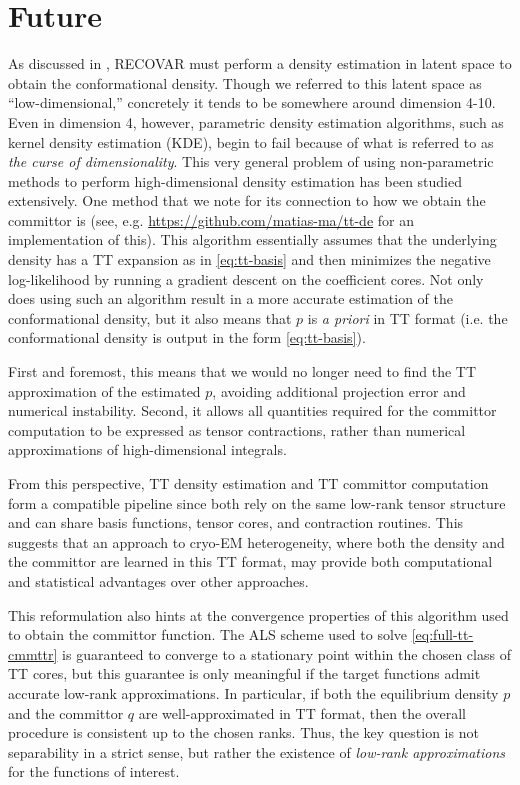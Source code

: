 \documentclass[11pt]{amsart}
\begin{document}
\section{Future}\label{sec:fut}
As discussed in , RECOVAR must perform a density estimation in latent space to obtain the conformational density. Though we referred to this latent space as ``low-dimensional,'' concretely it tends to be somewhere around dimension 4-10. Even in dimension 4, however, parametric density estimation algorithms, such as kernel density estimation (KDE), begin to fail because of what is referred to as \emph{the curse of dimensionality}. This very general problem of using non-parametric methods to perform high-dimensional density estimation has been studied extensively. One method that we note for its connection to how we obtain the committor is \cite{ttde} (see, e.g. \url{https://github.com/matias-ma/tt-de} for an implementation of this). This algorithm essentially assumes that the underlying density has a TT expansion as in \cref{eq:tt-basis} and then minimizes the negative log-likelihood by running a gradient descent on the coefficient cores. Not only does using such an algorithm result in a more accurate estimation of the conformational density, but it also means that $p$ is \emph{a priori} in TT format (i.e. the conformational density is output in the form \cref{eq:tt-basis}). 

First and foremost, this means that we would no longer need to find the TT approximation of the estimated $p$, avoiding additional projection error and numerical instability. Second, it allows all quantities required for the committor computation to be expressed as tensor contractions, rather than numerical approximations of high-dimensional integrals.

From this perspective, TT density estimation and TT committor computation form a compatible pipeline since both rely on the same low-rank tensor structure and can share basis functions, tensor cores, and contraction routines. This suggests that an approach to cryo-EM heterogeneity, where both the density and the committor are learned in this TT format, may provide both computational and statistical advantages over other approaches.

This reformulation also hints at the convergence properties of this algorithm used to obtain the committor function. The ALS scheme used to solve \cref{eq:full-tt-cmmttr} is guaranteed to converge to a stationary point within the chosen class of TT cores, but this guarantee is only meaningful if the target functions admit accurate low-rank approximations. In particular, if both the equilibrium density $p$ and the committor $q$ are well-approximated in TT format, then the overall procedure is consistent up to the chosen ranks. Thus, the key question is not separability in a strict sense, but rather the existence of \emph{low-rank approximations} for the functions of interest.
\end{document}
